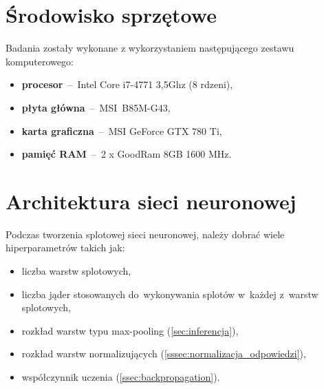 \section{Środowisko sprzętowe}
Badania zostały wykonane z wykorzystaniem następującego zestawu komputerowego:
\begin{itemize}
    \item \textbf{procesor}~--~Intel Core i7-4771 3,5Ghz (8 rdzeni),
    \item \textbf{płyta główna}~--~MSI~B85M-G43,
    \item \textbf{karta graficzna}~--~MSI GeForce GTX 780 Ti,
    \item \textbf{pamięć RAM}~--~2 x GoodRam 8GB 1600 MHz.
\end{itemize}

\section{Architektura sieci neuronowej}
Podczas tworzenia splotowej sieci neuronowej, należy dobrać wiele hiperparametrów takich jak:
\begin{itemize}
    \item liczba warstw splotowych,
    \item liczba jąder stosowanych do~wykonywania splotów w~każdej z~warstw splotowych,
    \item rozkład warstw typu max-pooling (\ref{sec:inferencja}),
    \item rozkład warstw normalizujących (\ref{sssec:normalizacja_odpowiedzi}),
    \item współczynnik uczenia (\ref{ssec:backpropagation}).
\end{itemize}

